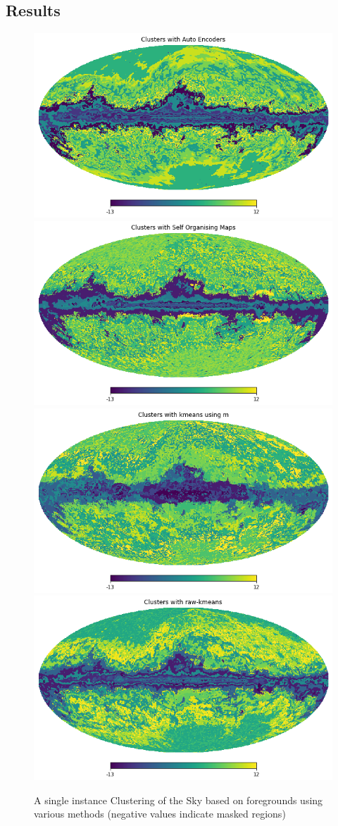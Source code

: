 \subsection{Results}
\begin{figure}[H]
  \centering
  \includegraphics[width=0.35\linewidth]{auto_clusters.png}
  \includegraphics[width=0.35\linewidth]{som_clusters.png}
  \includegraphics[width=0.35\linewidth]{kmeans_clusters.png}
  \includegraphics[width=0.35\linewidth]{raw_kmeans_clusters.png}
  \caption{A single instance Clustering of the Sky based on foregrounds using various methods (negative values indicate masked regions)}
\end{figure}



